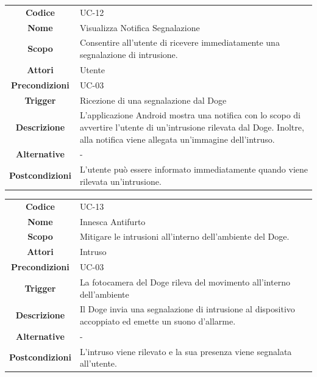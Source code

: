 \documentclass{article}
\begin{document}
\begin{adjustbox}{center}
\begin{tabular}{|c|p{10cm}|}
\hline
\textbf{Codice} & UC-12 \\
\textbf{Nome} & Visualizza Notifica Segnalazione \\
\textbf{Scopo} & Consentire all'utente di ricevere immediatamente una segnalazione di intrusione. \\
\textbf{Attori} & Utente \\
\textbf{Precondizioni} & UC-03 \\
\textbf{Trigger} & Ricezione di una segnalazione dal Doge \\
\textbf{Descrizione} & L'applicazione Android mostra una notifica con lo scopo di avvertire l'utente di un'intrusione rilevata dal Doge. Inoltre, alla notifica
viene allegata un'immagine dell'intruso. \\
\textbf{Alternative} & - \\
\textbf{Postcondizioni} & L'utente può essere informato immediatamente quando viene rilevata un'intrusione. \\
\hline
\end{tabular}
\end{adjustbox}

\begin{adjustbox}{center}
\begin{tabular}{|c|p{10cm}|}
\hline
\textbf{Codice} & UC-13 \\
\textbf{Nome} & Innesca Antifurto \\
\textbf{Scopo} & Mitigare le intrusioni all'interno dell'ambiente del Doge. \\
\textbf{Attori} & Intruso \\
\textbf{Precondizioni} & UC-03 \\
\textbf{Trigger} & La fotocamera del Doge rileva del movimento all'interno dell'ambiente \\
\textbf{Descrizione} & Il Doge invia una segnalazione di intrusione al dispositivo accoppiato ed emette un suono d'allarme. \\
\textbf{Alternative} & - \\
\textbf{Postcondizioni} & L'intruso viene rilevato e la sua presenza viene segnalata all'utente. \\
\hline
\end{tabular}
\end{adjustbox}
\end{document}
